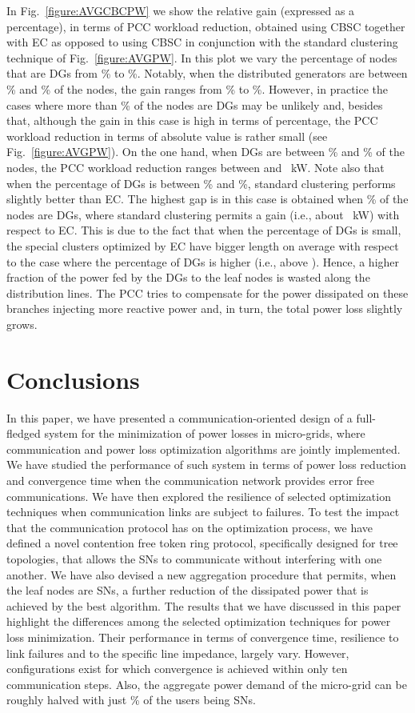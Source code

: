 \documentclass[journal]{IEEEtran}
\newcommand{\fig}[1]{Fig.~\ref{#1}}
\begin{document}
In \fig{figure:AVGCBCPW} we show the relative gain (expressed as a percentage), in terms of PCC workload reduction, obtained using CBSC together with EC as opposed to using CBSC in conjunction with the standard clustering technique of \fig{figure:AVGPW}. 
In this plot we vary the percentage of nodes that are DGs from \% to \%. Notably, when the distributed generators are between \% and \% of the nodes, the gain ranges from \% to \%. However, in practice the cases where more than \% of the nodes are DGs may be unlikely and, besides that, although the gain in this case is high in terms of percentage, the PCC workload reduction in terms of absolute value is rather small (see \fig{figure:AVGPW}). On the one hand, when DGs are between \% and \% of the nodes, the PCC workload reduction ranges between  and ~kW. Note also that when the percentage of DGs is between \% and \%, standard clustering performs slightly better than EC. The highest gap is in this case is obtained when \% of the nodes are DGs, where standard clustering permits a  gain (i.e., about ~kW) with respect to EC. This is due to the fact that when the percentage of DGs is small, the special clusters optimized by EC have bigger length on average with respect to the case where the percentage of DGs is higher (i.e., above ). Hence, a higher fraction of the power fed by the DGs to the leaf nodes is wasted along the distribution lines. The PCC tries to compensate for the power dissipated on these branches injecting more reactive power and, in turn, the total power loss slightly grows.




\section{Conclusions}
\label{sec:conclusions}
In this paper, we have presented a communication-oriented design of a full-fledged system for the minimization of power losses in micro-grids, where communication and power loss optimization algorithms are jointly implemented. We have studied the performance of such system in terms of power loss reduction and convergence time when the communication network provides error free communications. We have then explored the resilience of selected optimization techniques when communication links are subject to failures. To test the impact that the communication protocol has on the optimization process, we have defined a novel contention free token ring protocol, specifically designed for tree topologies, that allows the SNs to communicate without interfering with one another. We have also devised a new aggregation procedure that permits, when the leaf nodes are SNs, a further reduction of the dissipated power that is achieved by the best algorithm. The results that we have discussed in this paper highlight the differences among the selected optimization techniques for power loss minimization. Their performance in terms of convergence time, resilience to link failures and to the specific line impedance, largely vary. However, configurations exist for which convergence is achieved within only ten communication steps. Also, the aggregate power demand of the micro-grid can be roughly halved with just \% of the users being SNs. 




\nocite{*}

\enlargethispage{-45mm}
\end{document}
